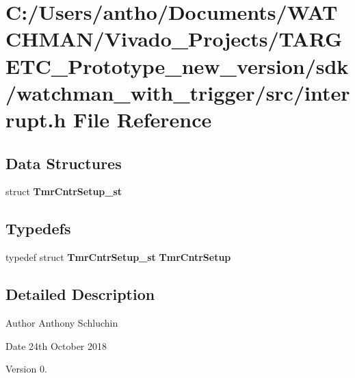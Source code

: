\section{C\+:/\+Users/antho/\+Documents/\+W\+A\+T\+C\+H\+M\+A\+N/\+Vivado\+\_\+\+Projects/\+T\+A\+R\+G\+E\+T\+C\+\_\+\+Prototype\+\_\+new\+\_\+version/sdk/watchman\+\_\+with\+\_\+trigger/src/interrupt.h File Reference}
\label{interrupt_8h}
\subsection*{Data Structures}
\begin{DoxyCompactItemize}
\item 
struct \textbf{ Tmr\+Cntr\+Setup\+\_\+st}
\end{DoxyCompactItemize}
\subsection*{Typedefs}
\begin{DoxyCompactItemize}
\item 
\mbox{\label{interrupt_8h_a93acdc4c82d9680ff8067b9a57d9035a}} 
typedef struct \textbf{ Tmr\+Cntr\+Setup\+\_\+st} {\bfseries Tmr\+Cntr\+Setup}
\end{DoxyCompactItemize}


\subsection{Detailed Description}
\begin{DoxyAuthor}{Author}
Anthony Schluchin 
\end{DoxyAuthor}
\begin{DoxyDate}{Date}
24th October 2018 
\end{DoxyDate}
\begin{DoxyVersion}{Version}
0. 
\end{DoxyVersion}
